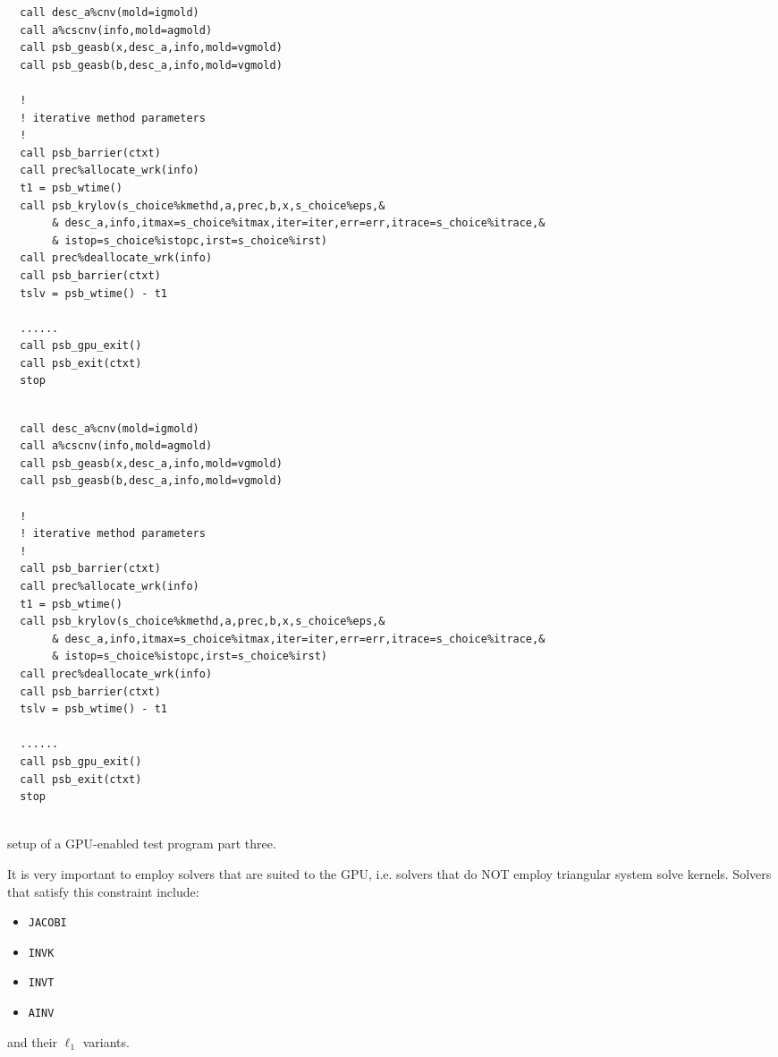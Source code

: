 \begin{listing}[h!]
\ifpdf
\begin{verbatim}
  call desc_a%cnv(mold=igmold)
  call a%cscnv(info,mold=agmold)
  call psb_geasb(x,desc_a,info,mold=vgmold)
  call psb_geasb(b,desc_a,info,mold=vgmold)

  !
  ! iterative method parameters
  !
  call psb_barrier(ctxt)
  call prec%allocate_wrk(info)
  t1 = psb_wtime()
  call psb_krylov(s_choice%kmethd,a,prec,b,x,s_choice%eps,&
       & desc_a,info,itmax=s_choice%itmax,iter=iter,err=err,itrace=s_choice%itrace,&
       & istop=s_choice%istopc,irst=s_choice%irst)
  call prec%deallocate_wrk(info)
  call psb_barrier(ctxt)
  tslv = psb_wtime() - t1

  ......
  call psb_gpu_exit()
  call psb_exit(ctxt)
  stop
  

\end{verbatim}
\else
\begin{center}
\begin{minipage}{.90\textwidth}
{\small
\begin{verbatim}
  call desc_a%cnv(mold=igmold)
  call a%cscnv(info,mold=agmold)
  call psb_geasb(x,desc_a,info,mold=vgmold)
  call psb_geasb(b,desc_a,info,mold=vgmold)

  !
  ! iterative method parameters
  !
  call psb_barrier(ctxt)
  call prec%allocate_wrk(info)
  t1 = psb_wtime()
  call psb_krylov(s_choice%kmethd,a,prec,b,x,s_choice%eps,&
       & desc_a,info,itmax=s_choice%itmax,iter=iter,err=err,itrace=s_choice%itrace,&
       & istop=s_choice%istopc,irst=s_choice%irst)
  call prec%deallocate_wrk(info)
  call psb_barrier(ctxt)
  tslv = psb_wtime() - t1

  ......
  call psb_gpu_exit()
  call psb_exit(ctxt)
  stop
  
 \end{verbatim}
}
\end{minipage}
\end{center}
\fi
\caption{setup of a GPU-enabled test program part three.\label{fig:gpu-ex3}}
\end{listing}

It is very important to employ solvers that are suited
to the GPU, i.e.  solvers that do NOT  employ triangular
system solve kernels.  Solvers that satisfy this constraint include:
\begin{itemize}
\item \verb|JACOBI|
\item \verb|INVK|
\item \verb|INVT|
\item \verb|AINV|
\end{itemize}
and their $\ell_1$ variants. 


